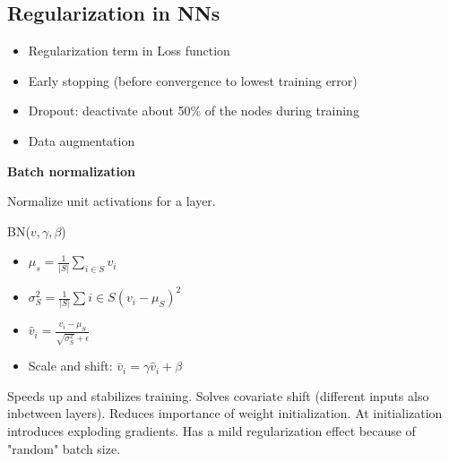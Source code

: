 \subsection{Regularization in NNs}

\begin{itemize}
    \item Regularization term in Loss function
    \item Early stopping (before convergence to lowest training error)
    \item Dropout: deactivate about 50\% of the nodes during training
    \item Data augmentation
\end{itemize}

\textbf{Batch normalization}

Normalize unit activations for a layer.  

BN($v,\gamma,\beta$)
\begin{itemize}
    \item $\mu_s = \frac{1}{|S|}\sum_{i\in S}v_i$
    \item $\sigma_S^2 = \frac{1}{|S|}\sum{i\in S}(v_i - \mu_S)^2$
    \item $\hat{v}_i = \frac{v_i - \mu_S}{\sqrt{\sigma_S^2} + \epsilon}$
    \item Scale and shift: $\bar{v}_i = \gamma\hat{v}_i + \beta$
\end{itemize}
Speeds up and stabilizes training. Solves covariate shift (different inputs also inbetween layers). Reduces importance of weight initialization. At initialization introduces exploding gradients. Has a mild regularization effect because of "random" batch size.